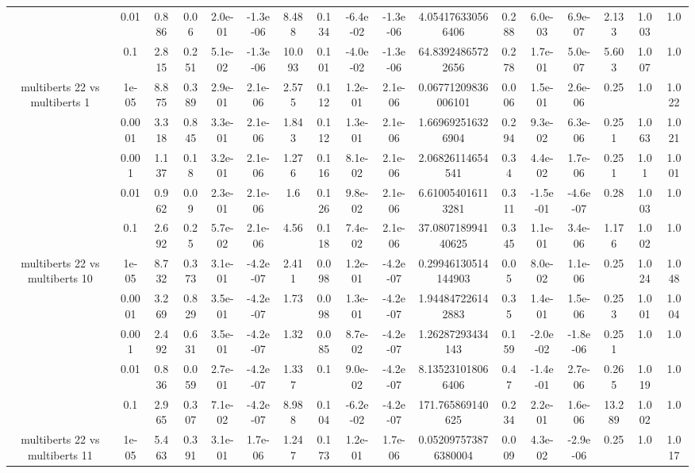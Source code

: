 \begin{tabular}{|c|c|c|c|c|c|c|c|c|c|c|c|c|c|c|c|c|}
 & 0.01 & 0.886 & 0.06 & 2.0e-01 & -1.3e-06 & 8.488 & 0.134 & -6.4e-02 & -1.3e-06 & 4.054176330566406 & 0.288 & 6.0e-03 & 6.9e-07 & 2.133 & 1.003 & 1.0 \\
 & 0.1 & 2.815 & 0.251 & 5.1e-02 & -1.3e-06 & 10.093 & 0.101 & -4.0e-02 & -1.3e-06 & 64.83924865722656 & 0.278 & 1.7e-01 & 5.0e-07 & 5.603 & 1.007 & 1.0 \\
\hline
\multirow{5}{*}{multiberts 22 vs multiberts 1} & 1e-05 & 8.875 & 0.389 & 2.9e-01 & 2.1e-06 & 2.575 & 0.112 & 1.2e-01 & 2.1e-06 & 0.06771209836006101 & 0.006 & 1.5e-01 & 2.6e-06 & 0.25 & 1.0 & 1.022 \\
 & 0.0001 & 3.318 & 0.845 & 3.3e-01 & 2.1e-06 & 1.843 & 0.112 & 1.3e-01 & 2.1e-06 & 1.669692516326904 & 0.294 & 9.3e-02 & 6.3e-06 & 0.251 & 1.063 & 1.021 \\
 & 0.001 & 1.137 & 0.18 & 3.2e-01 & 2.1e-06 & 1.276 & 0.116 & 8.1e-02 & 2.1e-06 & 2.06826114654541 & 0.34 & 4.4e-02 & 1.7e-06 & 0.251 & 1.01 & 1.001 \\
 & 0.01 & 0.962 & 0.09 & 2.3e-01 & 2.1e-06 & 1.6 & 0.126 & 9.8e-02 & 2.1e-06 & 6.610054016113281 & 0.311 & -1.5e-01 & -4.6e-07 & 0.28 & 1.003 & 1.0 \\
 & 0.1 & 2.692 & 0.25 & 5.7e-02 & 2.1e-06 & 4.56 & 0.118 & 7.4e-02 & 2.1e-06 & 37.080718994140625 & 0.345 & 1.1e-01 & 3.4e-06 & 1.176 & 1.002 & 1.0 \\
\hline
\multirow{5}{*}{multiberts 22 vs multiberts 10} & 1e-05 & 8.732 & 0.373 & 3.1e-01 & -4.2e-07 & 2.411 & 0.098 & 1.2e-01 & -4.2e-07 & 0.29946130514144903 & 0.05 & 8.0e-02 & 1.1e-06 & 0.25 & 1.024 & 1.048 \\
 & 0.0001 & 3.269 & 0.829 & 3.5e-01 & -4.2e-07 & 1.73 & 0.098 & 1.3e-01 & -4.2e-07 & 1.944847226142883 & 0.35 & 1.4e-01 & 1.5e-06 & 0.253 & 1.001 & 1.004 \\
 & 0.001 & 2.492 & 0.631 & 3.5e-01 & -4.2e-07 & 1.32 & 0.085 & 8.7e-02 & -4.2e-07 & 1.26287293434143 & 0.159 & -2.0e-02 & -1.8e-06 & 0.251 & 1.0 & 1.0 \\
 & 0.01 & 0.836 & 0.059 & 2.7e-01 & -4.2e-07 & 1.337 & 0.1 & 9.0e-02 & -4.2e-07 & 8.135231018066406 & 0.47 & -1.4e-01 & 2.7e-06 & 0.265 & 1.019 & 1.0 \\
 & 0.1 & 2.965 & 0.307 & 7.1e-02 & -4.2e-07 & 8.988 & 0.104 & -6.2e-02 & -4.2e-07 & 171.765869140625 & 0.234 & 2.2e-01 & 1.6e-06 & 13.289 & 1.002 & 1.0 \\
\hline
\multirow{5}{*}{multiberts 22 vs multiberts 11} & 1e-05 & 5.463 & 0.391 & 3.1e-01 & 1.7e-06 & 1.247 & 0.173 & 1.2e-01 & 1.7e-06 & 0.052097573876380004 & 0.009 & 4.3e-02 & -2.9e-06 & 0.25 & 1.0 & 1.017 \\

\end{tabular}
